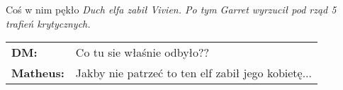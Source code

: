 \documentclass[10pt,twoside,twocolumn]{book}
\begin{document}
\begin{rpg-quotebox}{Coś w nim pękło}
   \textit{Duch elfa zabił Vivien. Po tym Garret wyrzucił pod rząd 5 trafień krytycznych.}\\
   \begin{tabularx}{\columnwidth}{lX}
      \textbf{DM:} & Co tu sie właśnie odbyło??\\
      \textbf{Matheus:} & Jakby nie patrzeć to ten elf zabił jego kobietę...\\
   \end{tabularx}
\end{rpg-quotebox}









%    
%       
\end{document}
